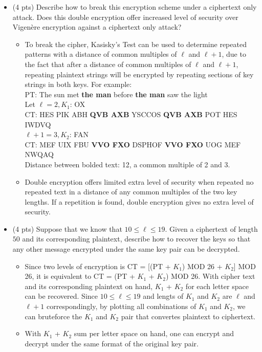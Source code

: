\documentclass[11pt]{article}
\begin{document}
\begin{description}
\begin{itemize}
 \item (4 pts)
Describe how to break this encryption scheme under a ciphertext only attack.  Does this double encryption offer increased level of security over Vigen\`{e}re encryption against a ciphertext only attack?
	\begin{itemize}
	\item
	To break the cipher, Kasisky's Test can be used to determine repeated patterns with a distance of common multiples of $\ell$ and $\ell + 1$, due to the fact that after a distance of common multiples of $\ell$ and $\ell + 1$, repeating plaintext strings will be encrypted by repeating sections of key strings in both keys. For example: \\
	PT: The sun met \textbf{the man} before \textbf{the man} saw the light \\
	Let $\ell = 2, K_1$: OX \\
	CT: HES PIK ABH \textbf{QVB AXB} YSCCOS \textbf{QVB AXB} POT HES IWDVQ \\
	$\ell + 1 = 3, K_2$: FAN \\
	CT: MEF UIX FBU \textbf{VVO FXO} DSPHOF \textbf{VVO FXO} UOG MEF NWQAQ \\
	Distance between bolded text: 12, a common multiple of 2 and 3.
	\item
	Double encryption offers limited extra level of security when repeated no repeated text in a distance of any common multiples of the two key lengths. If a repetition is found, double encryption gives no extra level of security. 
	\end{itemize}

 \item (4 pts)
Suppose that we know that $10\leq \ell \leq 19$.  Given a ciphertext of length $50$ and its corresponding plaintext, describe how to recover the keys so that any other message encrypted under the same key pair can be decrypted.
	\begin{itemize}
	\item
	Since two levels of encryption is CT = [(PT + $K_1$) MOD 26 + $K_2$] MOD 26, it is equivalent to CT = (PT + $K_1$ + $K_2$) MOD 26. With cipher text and its corresponding plaintext on hand, $K_1$ + $K_2$ for each letter space can be recovered. Since $10\leq \ell \leq 19$ and lengts of $K_1$ and $K_2$ are $\ell$ and $\ell+1$ correspondingly, by plotting all combinations of $K_1$ and $K_2$, we can bruteforce the $K_1$ and $K_2$ pair that convertes plaintext to ciphertext.
	\item	
	With $K_1$ + $K_2$ sum per letter space on hand, one can encrypt and decrypt under the same format of the original key pair.
	\end{itemize}
\end{itemize}



\end{description}
\end{document}
